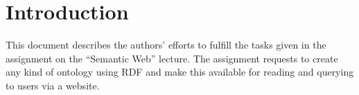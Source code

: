 \section{Introduction}
This document describes the authors' efforts to fulfill the tasks given in the assignment on the ``Semantic Web'' lecture. The assignment requests to create any kind of ontology using RDF and make this available for reading and querying to users via a website.